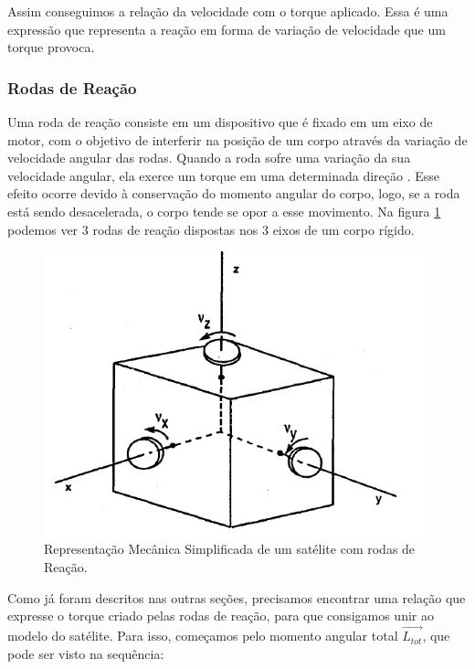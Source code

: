 Assim conseguimos a relação da velocidade com o torque aplicado. Essa é uma expressão que representa a reação em forma de variação de velocidade que um torque provoca.



\subsubsection{Rodas de Reação}

Uma roda de reação consiste em um dispositivo que é fixado em um eixo de motor, com o objetivo de interferir na posição de um corpo através da variação de velocidade angular das rodas. Quando a roda sofre uma variação da sua velocidade angular, ela exerce um torque em uma determinada direção \cite{BongWie2001}. Esse efeito ocorre devido à conservação do momento angular do corpo, logo, se a roda está sendo desacelerada, o corpo tende se opor a esse movimento. Na figura \ref{fig:satellite_controlhand_p1306} podemos ver 3 rodas de reação dispostas nos 3 eixos de um corpo rígido.

\begin{figure}[H]
  \caption{Representação Mecânica Simplificada de um satélite com rodas de Reação.}
  \begin{center}
      \includegraphics[scale=0.75]{referencial/img/satellite_controlhand_p1306}
  \end{center}
  \label{fig:satellite_controlhand_p1306}
\end{figure}

Como já foram descritos nas outras seções, precisamos encontrar uma relação que expresse o torque criado pelas rodas de reação, para que consigamos unir ao modelo do satélite. Para isso, começamos pelo momento angular total $\vec{L_{tot}}$, que pode ser visto na sequência:

